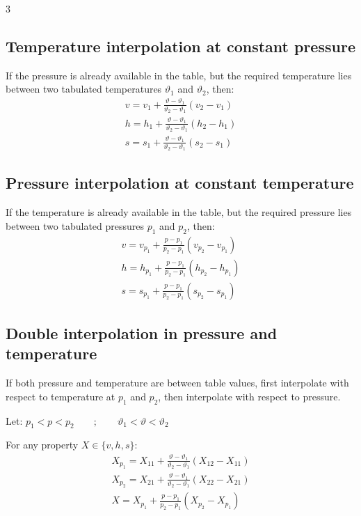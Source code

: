 \documentclass[9pt, landscape, a4paper]{article}
\begin{document}
\begin{multicols*}{3}
\subsection{Temperature interpolation at constant pressure}

If the pressure is already available in the table, but the required temperature
lies between two tabulated temperatures $\vartheta_1$ and $\vartheta_2$, then:
\begin{gather*}
  v = v_1 + \frac{\vartheta-\vartheta_1}{\vartheta_2-\vartheta_1}
  \left(v_2-v_1\right)\\[1ex]
  h = h_1 + \frac{\vartheta-\vartheta_1}{\vartheta_2-\vartheta_1}
  \left(h_2-h_1\right)\\[1ex]
  s = s_1 + \frac{\vartheta-\vartheta_1}{\vartheta_2-\vartheta_1}
  \left(s_2-s_1\right)
\end{gather*}

\subsection{Pressure interpolation at constant temperature}

If the temperature is already available in the table, but the required pressure
lies between two tabulated pressures $p_1$ and $p_2$, then:
\begin{gather*}
  v = v_{p_1} + \frac{p-p_1}{p_2-p_1}
  \left(v_{p_2}-v_{p_1}\right)\\[1ex]
  h = h_{p_1} + \frac{p-p_1}{p_2-p_1}
  \left(h_{p_2}-h_{p_1}\right)\\[1ex]
  s = s_{p_1} + \frac{p-p_1}{p_2-p_1}
  \left(s_{p_2}-s_{p_1}\right)
\end{gather*}

\subsection{Double interpolation in pressure and temperature}

If both pressure and temperature are between table values, first interpolate
with respect to temperature at $p_1$ and $p_2$, then interpolate with respect
to pressure.

Let: $p_1 < p < p_2 \qquad ; \qquad \vartheta_1 < \vartheta < \vartheta_2$

For any property $X \in \{v,h,s\}$:
\begin{gather*}
  X_{p_1} =
  X_{11} + \frac{\vartheta-\vartheta_1}{\vartheta_2-\vartheta_1}
  \left(X_{12}-X_{11}\right)\\[1ex]
  X_{p_2} =
  X_{21} + \frac{\vartheta-\vartheta_1}{\vartheta_2-\vartheta_1}
  \left(X_{22}-X_{21}\right)\\[1ex]
  X =
  X_{p_1} + \frac{p-p_1}{p_2-p_1}
  \left(X_{p_2}-X_{p_1}\right)
\end{gather*}


\end{multicols*}
\end{document}
